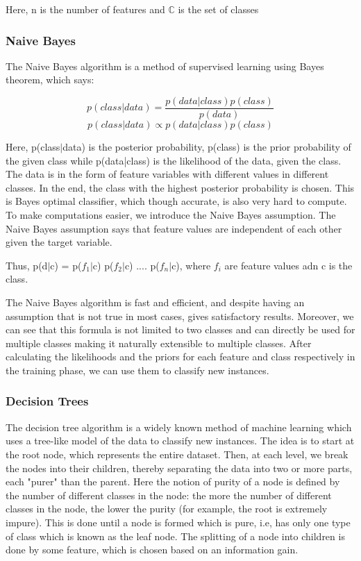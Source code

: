 \documentclass[letterpaper, 11 pt, conference]{IEEEtran}  %
\begin{document}
Here, n is the number of features and $\mathbb{C}$ is the set of classes

\subsubsection{\textbf{Naive Bayes}}
The Naive Bayes algorithm is a method of supervised learning using Bayes theorem, which says:

$$p(class|data) = \frac{p(data|class)p(class)}{p(data)}$$
$$p(class|data) \propto p(data|class)p(class)$$

Here, p(class$|$data) is the posterior probability, p(class) is the prior probability of the given class while p(data|class) is the likelihood of the data, given the class. The data is in the form of feature variables with different values in different classes. In the end, the class with the highest posterior probability is chosen. This is Bayes optimal classifier, which though accurate, is also very hard to compute. To make computations easier, we introduce the Naive Bayes assumption. The Naive Bayes assumption says that feature values are independent of each other given the target variable. 

Thus, p(d$|$c) = p($f_1|$c) p($f_2|$c) .... p($f_n|$c), where $f_i$ are feature values adn c is the class. 

The Naive Bayes algorithm is fast and efficient, and despite having an assumption that is not true in most cases, gives satisfactory results. Moreover, we can see that this formula is not limited to two classes and can directly be used for multiple classes making it naturally extensible to multiple classes. After calculating the likelihoods and the priors for each feature and class respectively in the training phase, we can use them to classify new instances. 

\subsubsection{\textbf{Decision Trees}}
The decision tree algorithm is a widely known method of machine learning which uses a tree-like model of the data to classify new instances. The idea is to start at the root node, which represents the entire dataset. Then, at each level, we break the nodes into their children, thereby separating the data into two or more parts, each "purer" than the parent. Here the notion of purity of a node is defined by the number of different classes in the node: the more the number of different classes in the node, the lower the purity (for example, the root is extremely impure). This is done until a node is formed which is pure, i.e, has only one type of class which is known as the leaf node. The splitting of a node into children is done by some feature, which is chosen based on an information gain.
\end{document}
